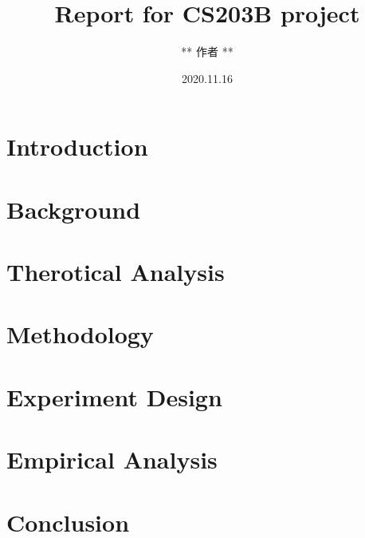 \documentclass[UTF8]{ctexart}
\begin{document}
    \title{Report for CS203B project}
    \author{** 作者 **}
    \date{2020.11.16}
    \maketitle
\tableofcontents

\section{Introduction}
\label{sec::Intro}

\section{Background}
\label{sec::bgnd}

\section{Therotical Analysis}
\label{sec::TA}

\section{Methodology}
\label{sec::Meth}

\section{Experiment Design}
\label{sec::ExpDesign}

\section{Empirical Analysis}
\label{sec::EmpAnlys}
\section{Conclusion}
\label{sec::Conc}
\end{document}
